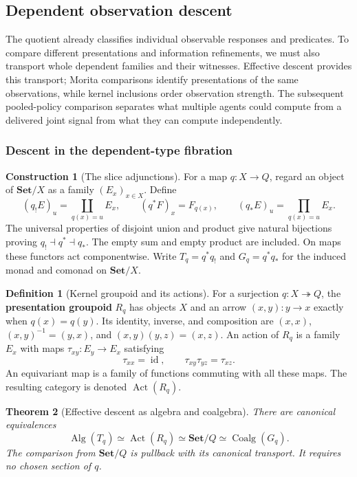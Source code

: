 \documentclass[11pt,a4paper]{article}
\numberwithin{equation}{section}
\newtheorem{theorem}{Theorem}[section]
\theoremstyle{definition}
\newtheorem{definition}[theorem]{Definition}
\newtheorem{construction}[construction]{Construction}
\theoremstyle{remark}
\theoremstyle{plain}
\begin{document}
\subsection{Dependent observation descent}
\label{sec:cgt-information}

The quotient already classifies individual observable responses and
predicates. To compare different presentations and information refinements,
we must also transport whole dependent families and their witnesses.
Effective descent provides this transport; Morita comparisons identify
presentations of the same observations, while kernel inclusions order
observation strength. The subsequent pooled-policy comparison separates
what multiple agents could compute from a delivered joint signal from
what they can compute independently.

\subsubsection{Descent in the dependent-type fibration}

\begin{construction}[The slice adjunctions]
\label{con:egt-slice-adjoints}
For a map $q:X\to Q$, regard an object of $\mathbf{Set}/X$ as a
family $(E_x)_{x\in X}$. Define
\[
 (q_!E)_u=\coprod_{q(x)=u}E_x,
 \qquad (q^*F)_x=F_{q(x)},
 \qquad(q_*E)_u=\prod_{q(x)=u}E_x.
\]
The universal properties of disjoint union and product give natural
bijections proving $q_!\dashv q^*\dashv q_*$. The empty sum and empty
product are included. On maps these functors act componentwise.
Write $T_q=q^*q_!$ and $G_q=q^*q_*$ for the induced monad and comonad
on $\mathbf{Set}/X$.
\end{construction}

\begin{definition}[Kernel groupoid and its actions]
\label{def:egt-presentation-groupoid}
For a surjection $q:X\twoheadrightarrow Q$, the \textbf{presentation
groupoid} $R_q$ has objects $X$ and an arrow $(x,y):y\to x$ exactly
when $q(x)=q(y)$. Its identity, inverse, and composition are
$(x,x)$, $(x,y)^{-1}=(y,x)$, and $(x,y)(y,z)=(x,z)$.
An action of $R_q$ is a family $E_x$ with maps
$\tau_{xy}:E_y\to E_x$ satisfying
\[
 \tau_{xx}=\operatorname{id},\qquad
 \tau_{xy}\tau_{yz}=\tau_{xz}.
\]
An equivariant map is a family of functions commuting with all these maps.
The resulting category is denoted $\operatorname{Act}(R_q)$.
\end{definition}

\begin{theorem}[Effective descent as algebra and coalgebra]
\label{thm:egt-descent-algebras}
There are canonical equivalences
\[
 \operatorname{Alg}(T_q)\simeq\operatorname{Act}(R_q)
 \simeq\mathbf{Set}/Q
 \simeq\operatorname{Coalg}(G_q).
\]
The comparison from $\mathbf{Set}/Q$ is pullback with its canonical
transport. It requires no chosen section of $q$.
\end{theorem}
\end{document}
